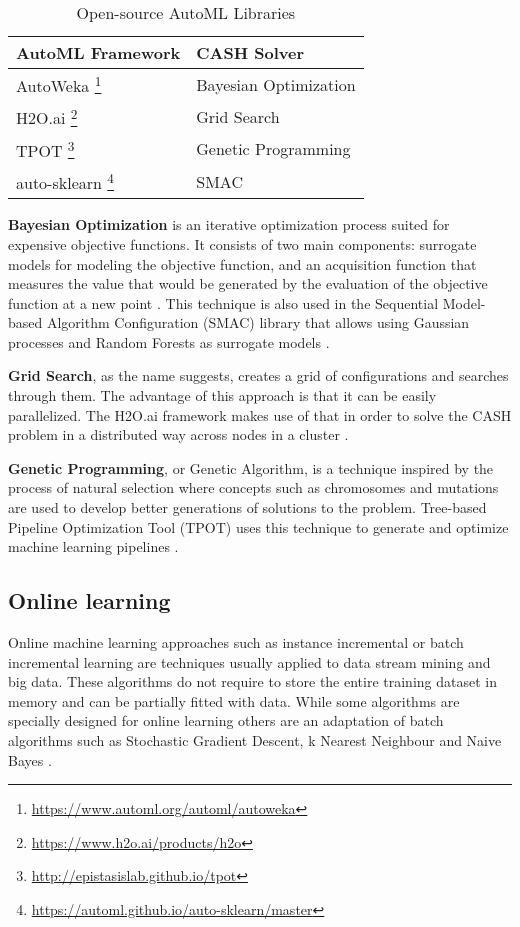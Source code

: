 \documentclass{sig-alternate-br}
\begin{document}
\begin{savenotes}
\begin{table}[h]
\renewcommand{\arraystretch}{1.25}
\centering
\begin{tabular}{|l|l|}
\hline
\textbf{AutoML Framework} & \textbf{CASH Solver} \\ \hline
AutoWeka \footnote{\url{https://www.automl.org/automl/autoweka}} & Bayesian Optimization \\ \hline
H2O.ai \footnote{\url{https://www.h2o.ai/products/h2o}} & Grid Search \\ \hline
TPOT \footnote{\url{http://epistasislab.github.io/tpot}} & Genetic Programming \\ \hline
auto-sklearn \footnote{\url{https://automl.github.io/auto-sklearn/master}} &  SMAC \\ \hline
\end{tabular}
\caption{Open-source AutoML Libraries}
\label{table:libraries}
\end{table}
\end{savenotes}

\textbf{Bayesian Optimization} is an iterative optimization process suited for expensive objective functions. It consists of two main components: surrogate models for modeling the objective function, and an acquisition function that measures the value that would be generated by the evaluation of the objective function at a new point \cite{zoller2019survey}. This technique is also used in the Sequential Model-based Algorithm Configuration (SMAC) library that allows using Gaussian processes and Random Forests as surrogate models \cite{feurer2015autosklearn}.

\textbf{Grid Search}, as the name suggests, creates a grid of configurations and searches through them. The advantage of this approach is that it can be easily parallelized. The H2O.ai framework makes use of that in order to solve the CASH problem in a distributed way across nodes in a cluster \cite{h2o}. 

\textbf{Genetic Programming}, or Genetic Algorithm, is a technique inspired by the process of natural selection where concepts such as chromosomes and mutations are used to develop better generations of solutions to the problem. Tree-based Pipeline Optimization Tool (TPOT) uses this technique to generate and optimize machine learning pipelines \cite{tpot}.

\subsection{Online learning}
Online machine learning approaches such as instance incremental or batch incremental learning are techniques usually applied to data stream mining and big data. These algorithms do not require to store the entire training dataset in memory and can be partially fitted with data. While some algorithms are specially designed for online learning \cite{bifet2012ensembles} others are an adaptation of batch algorithms such as Stochastic Gradient Descent, k Nearest Neighbour and Naive Bayes \cite{van2014algorithm}.
\end{document}
